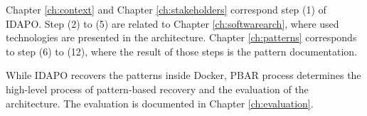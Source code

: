 Chapter \ref{ch:context} and Chapter \ref{ch:stakeholders} correspond step (1)
of IDAPO. Step (2) to (5) are related to Chapter \ref{ch:softwarearch}, where
used technologies are presented in the architecture. Chapter \ref{ch:patterns}
corresponds to step (6) to (12), where the result of those steps is the pattern
documentation.

While IDAPO recovers the patterns inside Docker, PBAR process determines the
high-level process of pattern-based recovery and the evaluation of the
architecture. The evaluation is documented in Chapter \ref{ch:evaluation}.